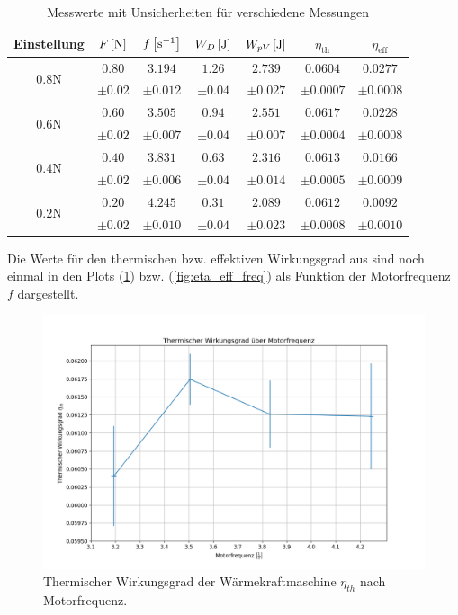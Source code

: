 \begin{table}[H]
    \centering
    \begin{tabular}{c c c c c c c}
    \toprule
    \textbf{Einstellung} & \boldmath$F\,\qty[\si{\newton}]$ & \boldmath$f\,\qty[\si{\per\second}]$ & \boldmath$W_D\,\qty[\si{\joule}]$ & \boldmath$W_{pV}\,\qty[\si{\joule}]$ & \boldmath$\eta_{\text{th}}$ & \boldmath$\eta_{\text{eff}}$ \\
    \midrule
    \multirow{2}{*}{\boldmath$0.8\si{\newton}$} & $0.80$ & $3.194$ & $1.26$ & $2.739$ & $0.0604$ & $0.0277$ \\
     & $\pm 0.02$ & $\pm 0.012$ & $\pm 0.04$ & $\pm 0.027$ & $\pm 0.0007$ & $\pm 0.0008$ \\
    \midrule
    \multirow{2}{*}{\boldmath$0.6\si{\newton}$} & $0.60$ & $3.505$ & $0.94$ & $2.551$ & $0.0617$ & $0.0228$ \\
     & $\pm 0.02$ & $\pm 0.007$ & $\pm 0.04$ & $\pm 0.007$ & $\pm 0.0004$ & $\pm 0.0008$ \\
    \midrule
    \multirow{2}{*}{\boldmath$0.4\si{\newton}$} & $0.40$ & $3.831$ & $0.63$ & $2.316$ & $0.0613$ & $0.0166$ \\
     & $\pm 0.02$ & $\pm 0.006$ & $\pm 0.04$ & $\pm 0.014$ & $\pm 0.0005$ & $\pm 0.0009$ \\
    \midrule
    \multirow{2}{*}{\boldmath$0.2\si{\newton}$} & $0.20$ & $4.245$ & $0.31$ & $2.089$ & $0.0612$ & $0.0092$ \\
     & $\pm 0.02$ & $\pm 0.010$ & $\pm 0.04$ & $\pm 0.023$ & $\pm 0.0008$ & $\pm 0.0010$ \\
    \bottomrule
    \end{tabular}
    \label{tab:werte_gebremst}
    \caption{Messwerte mit Unsicherheiten für verschiedene Messungen}
\end{table}

Die Werte für den thermischen bzw. effektiven Wirkungsgrad aus  sind noch einmal in den Plots (\ref{fig:eta_th_freq}) bzw. (\ref{fig:eta_eff_freq}) als Funktion der Motorfrequenz $f$ dargestellt.

\begin{figure}[H]
    \centering
    \includegraphics[width=.9\textwidth]{files/eta_th_freq.png}
    \caption{Thermischer Wirkungsgrad der Wärmekraftmaschine $\eta_{th}$ nach Motorfrequenz.}
    \label{fig:eta_th_freq}
\end{figure}


